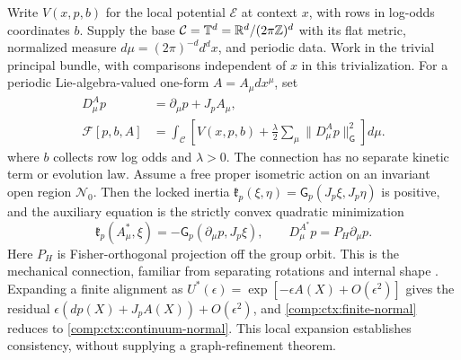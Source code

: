 Write $V(x,p,b)$ for the local potential $\mathcal E$ at context $x$, with rows in log-odds coordinates $b$. Supply the base $\mathcal C=\mathbb T^d=\mathbb R^d/(2\pi\mathbb Z)^d$ with its flat metric, normalized measure $d\mu=(2\pi)^{-d}d^dx$, and periodic data. Work in the trivial principal bundle, with comparisons independent of $x$ in this trivialization. For a periodic Lie-algebra-valued one-form $A=A_\mu dx^\mu$, set
\begin{equation}
 \begin{aligned}
 D^A_\mu p&=\partial_\mu p+J_pA_\mu,\\
 \mathcal F[p,b,A]&=\int_{\mathcal C}
 \left[V(x,p,b)+\frac\lambda2\sum_\mu
                  \|D^A_\mu p\|_{\mathsf G}^2\right]d\mu.
 \end{aligned}
 \label{comp:ctx:continuum-energy}
\end{equation}
where $b$ collects row log odds and $\lambda>0$. The connection has no separate kinetic term or evolution law. Assume a free proper isometric action on an invariant open region $\mathcal N_0$. Then the locked inertia $\mathfrak k_p(\xi,\eta)=\mathsf G_p(J_p\xi,J_p\eta)$ is positive, and the auxiliary equation is the strictly convex quadratic minimization
\begin{equation}
 \mathfrak k_p(A^*_\mu,\xi)
       =-\mathsf G_p(\partial_\mu p,J_p\xi),\qquad
 D^{A^*}_\mu p=P_H\partial_\mu p.
 \label{comp:ctx:continuum-normal}
\end{equation}
Here $P_H$ is Fisher-orthogonal projection off the group orbit. This is the mechanical connection, familiar from separating rotations and internal shape \citep{LittlejohnReinsch1997}. Expanding a finite alignment as $U^*(\epsilon)=\exp[-\epsilon A(X)+O(\epsilon^2)]$ gives the residual $\epsilon(dp(X)+J_pA(X))+O(\epsilon^2)$, and \cref{comp:ctx:finite-normal} reduces to \cref{comp:ctx:continuum-normal}. This local expansion establishes consistency, without supplying a graph-refinement theorem.

